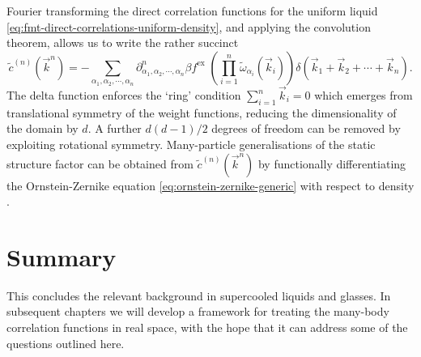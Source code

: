 \documentclass[11pt,twoside]{report}
\def\includebibliography{}
\begin{document}
Fourier transforming the direct correlation functions for the uniform liquid \eqref{eq:fmt-direct-correlations-uniform-density}, and applying the convolution theorem, allows us to write the rather succinct
\begin{equation}
  \widetilde{c}^{(n)}(\vec{k}^n)
  =
  - \sum_{\alpha_1, \alpha_2, \cdots, \alpha_n}
  \partial^n_{\alpha_1, \alpha_2, \cdots, \alpha_n} \beta f^\mathrm{ex} \;
  \left( \prod_{i=1}^n \widetilde{\omega}_{\alpha_i}(\vec{k}_i) \right)
  \delta(\vec{k}_1 + \vec{k}_2 + \cdots + \vec{k}_n).
\end{equation}
The delta function enforces the `ring' condition $\sum_{i=1}^n \vec{k}_i = 0$ which emerges from translational symmetry of the weight functions, reducing the dimensionality of the domain by $d$.
A further $d(d-1)/2$ degrees of freedom%
can be removed by exploiting rotational symmetry.
Many-particle generalisations of the static structure factor can be obtained from $\widetilde{c}^{(n)}(\vec{k}^n)$ by functionally differentiating the Ornstein-Zernike equation \eqref{eq:ornstein-zernike-generic} with respect to density \cite{BarratMP1988}.

\section{Summary}

This concludes the relevant background in supercooled liquids and glasses.
In subsequent chapters we will develop a framework for treating the many-body correlation functions in real space, with the hope that it can address some of the questions outlined here.

\ifdefined\includebibliography
  \printbibliography
\fi
\end{document}
